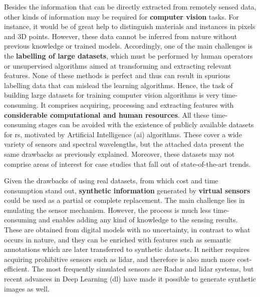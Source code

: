 Besides the information that can be directly extracted from remotely sensed data, other kinds of information may be required for \textbf{computer vision} tasks. For instance, it would be of great help to distinguish materials and instances in pixels and 3D points. However, these data cannot be inferred from nature without previous knowledge or trained models. Accordingly, one of the main challenges is the \textbf{labelling of large datasets}, which must be performed by human operators \cite{li_image_2021, basu_deepsat_2015} or unsupervised algorithms aimed at transforming and extracting relevant features. None of these methods is perfect and thus can result in spurious labelling data that can mislead the learning algorithms. Hence, the task of building large datasets for training computer vision algorithms is very time-consuming. It comprises acquiring, processing and extracting features with \textbf{considerable computational and human resources}. All these time-consuming stages can be avoided with the existence of publicly available datasets for \acrshort{rs}, motivated by Artificial Intelligence (\acrshort{ai}) algorithms. These cover a wide variety of sensors and spectral wavelengths, but the attached data present the same drawbacks as previously explained. Moreover, these datasets may not comprise areas of interest for case studies that fall out of state-of-the-art trends. 


Given the drawbacks of using real datasets, from which cost and time consumption stand out, \textbf{synthetic information} generated by \textbf{virtual sensors} could be used as a partial or complete replacement. The main challenge lies in emulating the sensor mechanism. However, the process is much less time-consuming and enables adding any kind of knowledge to the sensing results. These are obtained from digital models with no uncertainty, in contrast to what occurs in nature, and they can be enriched with features such as semantic annotations which are later transferred to synthetic datasets. It neither requires acquiring prohibitive sensors such as \acrshort{lidar}, and therefore is also much more cost-efficient. The most frequently simulated sensors are Radar and \acrshort{lidar} systems, but recent advances in Deep Learning (\acrshort{dl}) have made it possible to generate synthetic images as well. 

